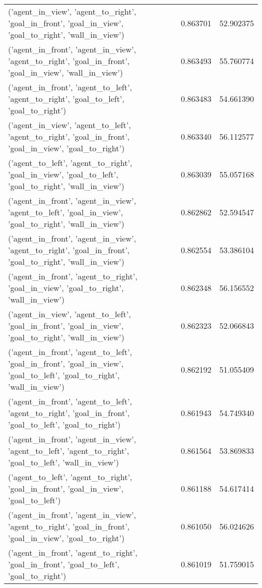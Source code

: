 \begin{tabular}{lrr}
('agent\_in\_view', 'agent\_to\_right', 'goal\_in\_front', 'goal\_in\_view', 'goal\_to\_right', 'wall\_in\_view') & 0.863701 & 52.902375 \\
('agent\_in\_front', 'agent\_in\_view', 'agent\_to\_right', 'goal\_in\_front', 'goal\_in\_view', 'wall\_in\_view') & 0.863493 & 55.760774 \\
('agent\_in\_front', 'agent\_to\_left', 'agent\_to\_right', 'goal\_to\_left', 'goal\_to\_right') & 0.863483 & 54.661390 \\
('agent\_in\_view', 'agent\_to\_left', 'agent\_to\_right', 'goal\_in\_front', 'goal\_in\_view', 'goal\_to\_right') & 0.863340 & 56.112577 \\
('agent\_to\_left', 'agent\_to\_right', 'goal\_in\_view', 'goal\_to\_left', 'goal\_to\_right', 'wall\_in\_view') & 0.863039 & 55.057168 \\
('agent\_in\_front', 'agent\_in\_view', 'agent\_to\_left', 'goal\_in\_view', 'goal\_to\_right', 'wall\_in\_view') & 0.862862 & 52.594547 \\
('agent\_in\_front', 'agent\_in\_view', 'agent\_to\_right', 'goal\_in\_front', 'goal\_to\_right', 'wall\_in\_view') & 0.862554 & 53.386104 \\
('agent\_in\_front', 'agent\_to\_right', 'goal\_in\_view', 'goal\_to\_right', 'wall\_in\_view') & 0.862348 & 56.156552 \\
('agent\_in\_view', 'agent\_to\_left', 'goal\_in\_front', 'goal\_in\_view', 'goal\_to\_right', 'wall\_in\_view') & 0.862323 & 52.066843 \\
('agent\_in\_front', 'agent\_to\_left', 'goal\_in\_front', 'goal\_in\_view', 'goal\_to\_left', 'goal\_to\_right', 'wall\_in\_view') & 0.862192 & 51.055409 \\
('agent\_in\_front', 'agent\_to\_left', 'agent\_to\_right', 'goal\_in\_front', 'goal\_to\_left', 'goal\_to\_right') & 0.861943 & 54.749340 \\
('agent\_in\_front', 'agent\_in\_view', 'agent\_to\_left', 'agent\_to\_right', 'goal\_to\_left', 'wall\_in\_view') & 0.861564 & 53.869833 \\
('agent\_to\_left', 'agent\_to\_right', 'goal\_in\_front', 'goal\_in\_view', 'goal\_to\_left') & 0.861188 & 54.617414 \\
('agent\_in\_front', 'agent\_in\_view', 'agent\_to\_right', 'goal\_in\_front', 'goal\_in\_view', 'goal\_to\_right') & 0.861050 & 56.024626 \\
('agent\_in\_front', 'agent\_to\_right', 'goal\_in\_front', 'goal\_to\_left', 'goal\_to\_right') & 0.861019 & 51.759015 \\

\end{tabular}
